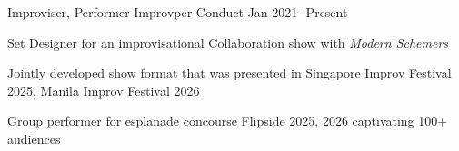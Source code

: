 

\begin{cventries}

  \cventry
  {Improviser, Performer} %
  {Improvper Conduct} %
  {} %
  {Jan 2021- Present} %
  {
    \begin{cvitems} %
      \item {Set Designer for an improvisational Collaboration show with \textit{Modern Schemers}}
      \item {Jointly developed show format that was presented in Singapore Improv Festival 2025, Manila Improv Festival 2026}
      \item {Group performer for esplanade concourse Flipside 2025, 2026 captivating 100+ audiences}
    \end{cvitems}
  }



\end{cventries}
